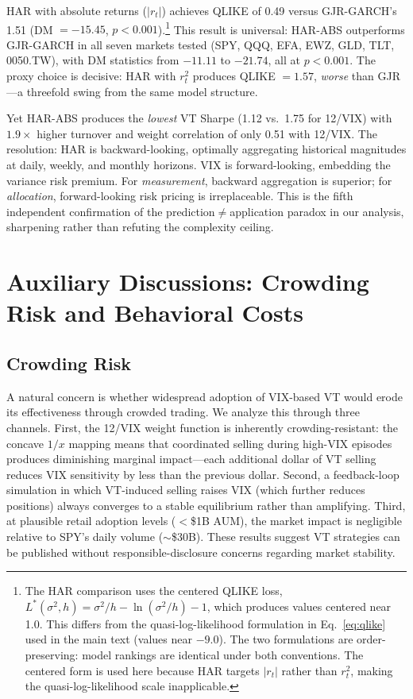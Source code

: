 HAR with absolute returns ($|r_t|$) achieves QLIKE of 0.49 versus GJR-GARCH's 1.51 (DM $= -15.45$, $p < 0.001$).\footnote{The HAR comparison uses the \citet{patton2011} centered QLIKE loss, $L^*(\sigma^2, h) = \sigma^2/h - \ln(\sigma^2/h) - 1$, which produces values centered near 1.0. This differs from the quasi-log-likelihood formulation in Eq.~\eqref{eq:qlike} used in the main text (values near $-9.0$). The two formulations are order-preserving: model rankings are identical under both conventions. The centered form is used here because HAR targets $|r_t|$ rather than $r^2_t$, making the quasi-log-likelihood scale inapplicable.} This result is universal: HAR-ABS outperforms GJR-GARCH in all seven markets tested (SPY, QQQ, EFA, EWZ, GLD, TLT, 0050.TW), with DM statistics from $-11.11$ to $-21.74$, all at $p < 0.001$. The proxy choice is decisive: HAR with $r^2_t$ produces QLIKE $= 1.57$, \textit{worse} than GJR---a threefold swing from the same model structure.

Yet HAR-ABS produces the \textit{lowest} VT Sharpe (1.12 vs.\ 1.75 for 12/VIX) with $1.9\times$ higher turnover and weight correlation of only 0.51 with 12/VIX. The resolution: HAR is backward-looking, optimally aggregating historical magnitudes at daily, weekly, and monthly horizons. VIX is forward-looking, embedding the variance risk premium. For \textit{measurement}, backward aggregation is superior; for \textit{allocation}, forward-looking risk pricing is irreplaceable. This is the fifth independent confirmation of the prediction$\neq$application paradox in our analysis, sharpening rather than refuting the complexity ceiling.

\section{Auxiliary Discussions: Crowding Risk and Behavioral Costs}
\label{sec:aux_discussions}

\subsection{Crowding Risk}

A natural concern is whether widespread adoption of VIX-based VT would erode its effectiveness through crowded trading. We analyze this through three channels. First, the 12/VIX weight function is inherently crowding-resistant: the concave $1/x$ mapping means that coordinated selling during high-VIX episodes produces diminishing marginal impact---each additional dollar of VT selling reduces VIX sensitivity by less than the previous dollar. Second, a feedback-loop simulation in which VT-induced selling raises VIX (which further reduces positions) always converges to a stable equilibrium rather than amplifying. Third, at plausible retail adoption levels ($<$\$1B AUM), the market impact is negligible relative to SPY's daily volume ($\sim$\$30B). These results suggest VT strategies can be published without responsible-disclosure concerns regarding market stability.

